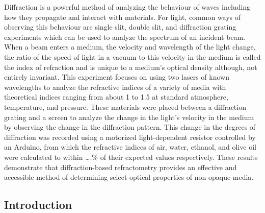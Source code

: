 \documentclass[11pt]{article}
\begin{document}
    Diffraction is a powerful method of analyzing the behaviour of waves
including how they propagate and interact with materials. For light,
common ways of observing this behaviour are single slit, double slit,
and diffraction grating experiments which can be used to analyze the
spectrum of an incident beam. When a beam enters a medium, the velocity
and wavelength of the light change, the ratio of the speed of light in a
vacuum to this velocity in the medium is called the index of refraction
and is unique to a medium's optical density although, not entirely
invariant. This experiment focuses on using two lasers of known
wavelengths to analyze the refractive indices of a variety of media with
theoretical indices ranging from about 1 to 1.5 at standard atmosphere,
temperature, and pressure. These materials were placed between a
diffraction grating and a screen to analyze the change in the light's
velocity in the medium by observing the change in the diffraction
pattern. This change in the degrees of diffraction was recorded using a
motorized light-dependent resistor controlled by an Arduino, from which
the refractive indices of air, water, ethanol, and olive oil were
calculated to within \ldots.\% of their expected values respectively.
These results demonstrate that diffraction-based refractometry provides
an effective and accessible method of determining select optical
properties of non-opaque media.

    \hypertarget{introduction}{%
\subsection{Introduction}\label{introduction}}
\end{document}
